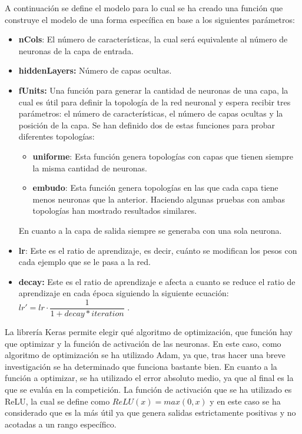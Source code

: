 \documentclass[acmtog, screen]{acmart}
\begin{document}
A continuación se define el modelo para lo cual se ha creado una función que construye el modelo de una forma específica en base a los siguientes parámetros:
\begin{itemize}
	\item \textbf{nCols}: El número de características, la cual será equivalente al número de neuronas de la capa de entrada.
	\item \textbf{hiddenLayers:} Número de capas ocultas.
	\item \textbf{fUnits:} Una función para generar la cantidad de neuronas de una capa, la cual es útil para definir la topología de la red neuronal y espera recibir tres parámetros: el número de características, el número de capas ocultas y la posición de la capa. Se han definido dos de estas funciones para probar diferentes topologías:
	\begin{itemize}
		\item \textbf{uniforme}: Esta función genera topologías con capas que tienen siempre la misma cantidad de neuronas.
		\item \textbf{embudo}: Esta función genera topologías en las que cada capa tiene menos neuronas que la anterior. Haciendo algunas pruebas con ambas topologías han mostrado resultados similares.
	\end{itemize}
	En cuanto a la capa de salida siempre se generaba con una sola neurona.
	\item \textbf{lr}: Este es el ratio de aprendizaje, es decir, cuánto se modifican los pesos con cada ejemplo que se le pasa a la red.
	\item \textbf{decay:} Este es el ratio de aprendizaje e afecta a cuanto se reduce el ratio de aprendizaje en cada época siguiendo la siguiente ecuación: $lr' = lr \cdot \dfrac{1}{1+decay*iteration}$ .
\end{itemize}
La librería Keras permite elegir qué algoritmo de optimización, que función hay que optimizar y la función de activación de las neuronas. En este caso, como algoritmo de optimización se ha utilizado Adam, ya que, tras hacer una breve investigación se ha determinado que funciona bastante bien. En cuanto a la función a optimizar, se ha utilizado el error absoluto medio, ya que al final es la que se evalúa en la competición. La función de activación que se ha utilizado es ReLU, la cual se define como $ReLU(x) = max(0,x)$ y en este caso se ha considerado que es la más útil ya que genera salidas estrictamente positivas y no acotadas a un rango específico.
\end{document}
